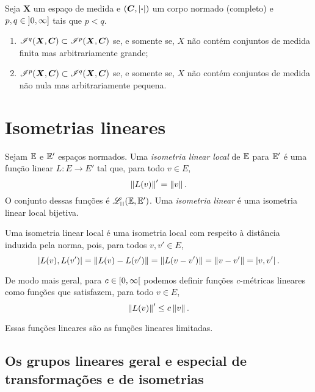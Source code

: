 \begin{proposition}
Seja $\bm X$ um espaço de medida e $(\bm C,\left\vert{\bm{\cdot}}\right\vert)$ um corpo normado (completo) e $p,q \in \left]{0},{\infty}\right]$ tais que $p < q$.
	\begin{enumerate}
	\item $\mathscr{I}^q(\bm X,\bm C) \subset \mathscr{I}^p(\bm X,\bm C)$ se, e somente se, $X$ não contém conjuntos de medida finita mas arbitrariamente grande;
	
	\item $\mathscr{I}^p(\bm X,\bm C) \subset \mathscr{I}^q(\bm X,\bm C)$ se, e somente se, $X$ não contém conjuntos de medida não nula mas arbitrariamente pequena.
	\end{enumerate}
\end{proposition}




\section{Isometrias lineares}

\begin{definition}
Sejam $\mathbb{E}$ e $\mathbb{E}'$ espaços normados. Uma \emph{isometria linear local} de $\mathbb{E}$ para $\mathbb{E}'$ é uma função linear $L\colon E \to E'$ tal que, para todo $v \in E$,
	\begin{equation*}
	\left\Vert{L(v)}\right\Vert' = \left\Vert{v}\right\Vert.
	\end{equation*}
O conjunto dessas funções é $\Linmet(\E,\E')$. Uma \emph{isometria linear} é uma isometria linear local bijetiva.
\end{definition}

Uma isometria linear local é uma isometria local com respeito à distância induzida pela norma, pois, para todos $v,v' \in E$,
	\begin{equation*}
	\left\vert{L(v)},{L(v')}\right\vert = \left\Vert{L(v) - L(v')}\right\Vert = \left\Vert{L(v - v')}\right\Vert = \left\Vert{v - v'}\right\Vert = \left\vert{v},{v'}\right\vert.
	\end{equation*}

De modo mais geral, para $c \in \left[{0},{\infty}\right[$ podemos definir funções $c$-métricas lineares como funções que satisfazem, para todo $v \in E$,
	\begin{equation*}
	\left\Vert{L(v)}\right\Vert' \leq c \left\Vert{v}\right\Vert.
	\end{equation*}

Essas funções lineares são as funções lineares limitadas.



\subsection{Os grupos lineares geral e especial de transformações e de isometrias}

